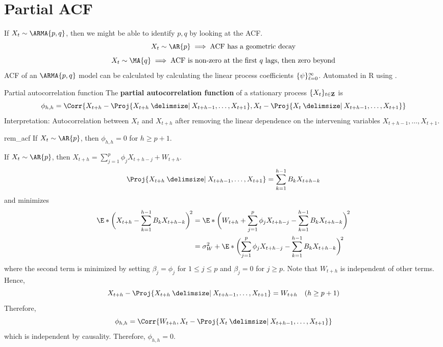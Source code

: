 \section{Partial ACF}
If $ X_t \sim \ARMA{p,q} $, then we might be able to identify
$ p,q $ by looking at the ACF\@.
\[ X_t \sim \AR{p}\implies\text{ACF has a geometric decay} \]
\[ X_t \sim \MA{q}\implies\text{ACF is non-zero at the first $q$ lags, then zero beyond} \]
ACF of an $ \ARMA{p,q} $ model can be calculated by calculating
the linear process coefficients $ \{\psi\}_{\ell=0}^\infty $.
Automated in R using .
\begin{Definition}{Partial autocorrelation function}{}
    The \textbf{partial autocorrelation function} of a stationary
    process $ \{X_t\}_{t\in\mathbf{Z}} $ is
    \[ \phi_{h,h}=\Corr{X_{t+h}-\Proj{X_{t+h}\onto X_{t+h-1},\ldots,X_{t+1}},
        X_{t}-\Proj{X_t\onto X_{t+h-1},\ldots,X_{t+1}}} \]
    Interpretation: Autocorrelation between $ X_t $ and $ X_{t+h} $
    after removing the linear dependence on the intervening variables $ X_{t+h-1},\ldots,X_{t+1} $.
\end{Definition}
\begin{Remark}{}{rem_acf}
    If $ X_t \sim \AR{p} $, then $ \phi_{h,h}=0 $ for $ h\ge p+1 $.
\end{Remark}
\begin{Proof}{}{}
    If $ X_t \sim \AR{p} $, then $ X_{t+h}=\sum_{j=1}^{p} \phi_j X_{t+h-j} +W_{t+h} $.
    \[ \Proj{X_{t+h}\onto X_{t+h-1},\ldots,X_{t+1}}=
        \sum_{k=1}^{h-1}B_k X_{t+h-k}  \]
    and minimizes
    \begin{align*}
        \E*{\biggl(X_{t+h}-\sum_{k=1}^{h-1} B_k X_{t+h-k}\biggr)^{\!2}}
         & =\E*{\biggl(W_{t+h}+\sum_{j=1}^{p} \phi_j X_{t+h-j}
        -\sum_{k=1}^{h-1} B_k X_{t+h-k}\biggr)^{\!2}}                                                          \\
         & =\sigma_W^2+\E*{\biggl(\sum_{j=1}^{p} \phi_j X_{t+h-j}-\sum_{k=1}^{h-1} B_k X_{t+h-k}\biggr)^{\!2}}
    \end{align*}
    where the second term is minimized by setting $ \beta_j=\phi_j $ for $ 1\le j\le p $
    and $ \beta_j=0 $ for $ j\ge p $. Note that $ W_{t+h} $ is independent of other terms.
    Hence,
    \[ X_{t+h}-\Proj{X_{t+h}\onto X_{t+h-1},\ldots,X_{t+1}}=W_{t+h}\quad(h\ge p+1) \]
    Therefore,
    \[ \phi_{h,h}=\Corr{W_{t+h},X_t-\Proj{X_t\onto X_{t+h-1},\ldots,X_{t+1}}} \]
    which is independent by causality. Therefore, $ \phi_{h,h}=0 $.
\end{Proof}
